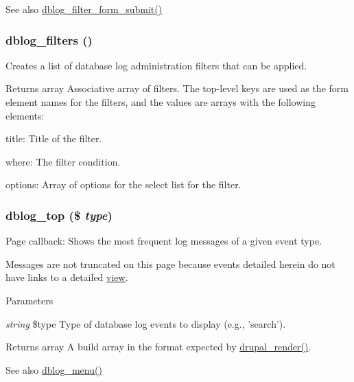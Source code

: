 \begin{DoxySeeAlso}{See also}
\hyperlink{dblog_8admin_8inc_a817953760089fe9caf59d187d3784433}{dblog\_\-filter\_\-form\_\-submit()} 
\end{DoxySeeAlso}
\hypertarget{dblog_8admin_8inc_a7f01185081208827159e2cf7546acb83}{
\subsubsection[{dblog\_\-filters}]{\setlength{\rightskip}{0pt plus 5cm}dblog\_\-filters ()}}
\label{dblog_8admin_8inc_a7f01185081208827159e2cf7546acb83}
Creates a list of database log administration filters that can be applied.

\begin{DoxyReturn}{Returns}
array Associative array of filters. The top-\/level keys are used as the form element names for the filters, and the values are arrays with the following elements:
\begin{DoxyItemize}
\item title: Title of the filter.
\item where: The filter condition.
\item options: Array of options for the select list for the filter. 
\end{DoxyItemize}
\end{DoxyReturn}
\hypertarget{dblog_8admin_8inc_af0e96daec46eb718e54a9adde8ec9ce1}{
\subsubsection[{dblog\_\-top}]{\setlength{\rightskip}{0pt plus 5cm}dblog\_\-top (\$ {\em type})}}
\label{dblog_8admin_8inc_af0e96daec46eb718e54a9adde8ec9ce1}
Page callback: Shows the most frequent log messages of a given event type.

Messages are not truncated on this page because events detailed herein do not have links to a detailed \hyperlink{classview}{view}.


\begin{DoxyParams}{Parameters}
\item[{\em string}]\$type Type of database log events to display (e.g., 'search').\end{DoxyParams}
\begin{DoxyReturn}{Returns}
array A build array in the format expected by \hyperlink{common_8inc_a05798b44e8d6c496d4bee5cc32fa7851}{drupal\_\-render()}.
\end{DoxyReturn}
\begin{DoxySeeAlso}{See also}
\hyperlink{dblog_8module_ac599cb2337e45bf5268f593e84039684}{dblog\_\-menu()} 
\end{DoxySeeAlso}
